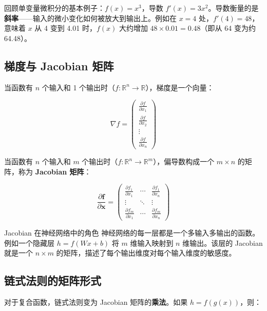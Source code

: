 \documentclass[a4paper]{article}
\begin{document}



回顾单变量微积分的基本例子：$f(x) = x^3$，导数 $f'(x) = 3x^2$。导数衡量的是\textbf{斜率}——输入的微小变化如何被放大到输出上。例如在 $x = 4$ 处，$f'(4) = 48$，意味着 $x$ 从 4 变到 4.01 时，$f(x)$ 大约增加 $48 \times 0.01 = 0.48$（即从 64 变为约 64.48）。

\subsection{梯度与 Jacobian 矩阵}

当函数有 $n$ 个输入和 1 个输出时（$f: \mathbb{R}^n \to \mathbb{R}$），梯度是一个向量：

$$\nabla f = \begin{pmatrix} \frac{\partial f}{\partial x_1} \\ \frac{\partial f}{\partial x_2} \\ \vdots \\ \frac{\partial f}{\partial x_n} \end{pmatrix}$$

当函数有 $n$ 个输入和 $m$ 个输出时（$f: \mathbb{R}^n \to \mathbb{R}^m$），偏导数构成一个 $m \times n$ 的矩阵，称为 \textbf{Jacobian 矩阵}：

$$\frac{\partial \mathbf{f}}{\partial \mathbf{x}} = \begin{pmatrix} \frac{\partial f_1}{\partial x_1} & \cdots & \frac{\partial f_1}{\partial x_n} \\ \vdots & \ddots & \vdots \\ \frac{\partial f_m}{\partial x_1} & \cdots & \frac{\partial f_m}{\partial x_n} \end{pmatrix}$$





\begin{knowledgebox}{Jacobian 在神经网络中的角色}
神经网络的每一层都是一个多输入多输出的函数。例如一个隐藏层 $h = f(Wx + b)$ 将 $m$ 维输入映射到 $n$ 维输出。该层的 Jacobian 就是一个 $n \times m$ 的矩阵，描述了每个输出维度对每个输入维度的敏感度。
\end{knowledgebox}

\subsection{链式法则的矩阵形式}

对于复合函数，链式法则变为 Jacobian 矩阵的\textbf{乘法}。如果 $h = f(g(x))$，则：
\end{document}
